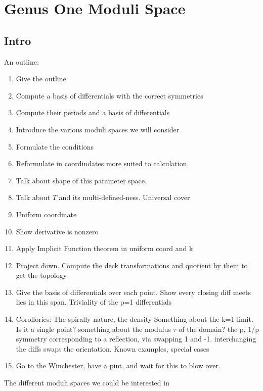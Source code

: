 
\section{Genus One Moduli Space}

\subsection{Intro}
\label{sub:Intro}

An outline:
\begin{enumerate}
\item
Give the outline
\item
Compute a basis of differentials with the correct symmetries
\item
Compute their periods and a basis of differentials
\item
Introduce the various moduli spaces we will consider
\item
Formulate the conditions
\item
Reformulate in coordindates more suited to calculation.
\item
Talk about shape of this parameter space.
\item
Talk about $T$ and its multi-defined-ness. Universal cover
\item
Uniform coordinate
\item
Show derivative is nonzero
\item
Apply Implicit Function theorem in uniform coord and k
\item
Project down. Compute the deck transformations and quotient by them to get the topology
\item
Give the basis of differentials over each point. Show every closing diff meets lies in this span. Triviality of the p=1 differentials
\item
Corollories:
The spirally nature, the density
Something about the k=1 limit. Is it a single point?
something about the modulus $τ$ of the domain?
the p, 1/p symmetry corresponding to a reflection, via swapping 1 and -1.
interchanging the diffs swaps the orientation.
Known examples, special cases
\item
Go to the Winchester, have a pint, and wait for this to blow over.
\end{enumerate}

The different moduli spaces we could be interested in

